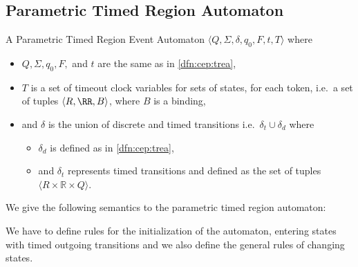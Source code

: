 	\subsection{Parametric Timed Region Automaton}
		
		
		\begin{dfn}
			\label{dfn:cep:ptrea}
			A Parametric Timed Region Event Automaton $\langle Q,\Sigma,\delta,q_0, F, t, T \rangle$ where
			\begin{itemize}
				\item $Q, \Sigma, q_0, F,$ and  $t$ are the same as in \cref{dfn:cep:trea},
				\item $T$ is a set of timeout clock variables for sets of states, for each token, i.e.~a set of tuples $\langle R, \RR, B \rangle$, where $B$ is a binding,
				\item and $\delta$ is the union of discrete and timed transitions i.e.~$\delta_t \cup \delta_d$ where
				\begin{itemize}
					\item $\delta_d$ is defined as in \cref{dfn:cep:trea},
					\item and $\delta_t$ represents timed transitions and defined as the set of tuples $\langle R \times \mathbb{R} \times Q \rangle$.
				\end{itemize}
			\end{itemize}
		\end{dfn}
		
		We give the following semantics to the parametric timed region automaton:
		
		We have to define rules for the initialization of the automaton,
		entering states with timed outgoing transitions 
		and we also define the general rules of changing states. 
		
